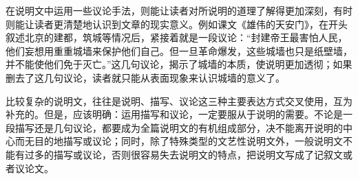 在说明文中运用一些议论手法，则能让读者对所说明的道理了解得更加深刻，有时则能让读者更清楚地认识到文章的现实意义。例如课文《雄伟的天安门》，在开头叙述北京的建都，筑城等情况后，紧接着就是一段议论：“封建帝王最害怕人民，他们妄想用重重城墙来保护他们自己。但一旦革命爆发，这些城墙也只是纸壁墙，并不能使他们免于灭亡。”这几句议论，揭示了城墙的本质，使说明更加透彻；如果删去了这几句议论，读者就只能从表面现象来认识城墙的意义了。

比较复杂的说明文，往往是说明、描写、议论这三种主要表达方式交叉使用，互为补充的。但是，应该明确：运用描写和议论，一定要服从于说明的需要。不论是一段描写还是几句议论，都要成为全篇说明文的有机组成部分，决不能离开说明的中心而无目的地描写或议论；同时，除了特殊类型的文艺性说明文外，一般说明文不能有过多的描写或议论，否则很容易失去说明文的特点，把说明文写成了记叙文或者议论文。
\newpage
